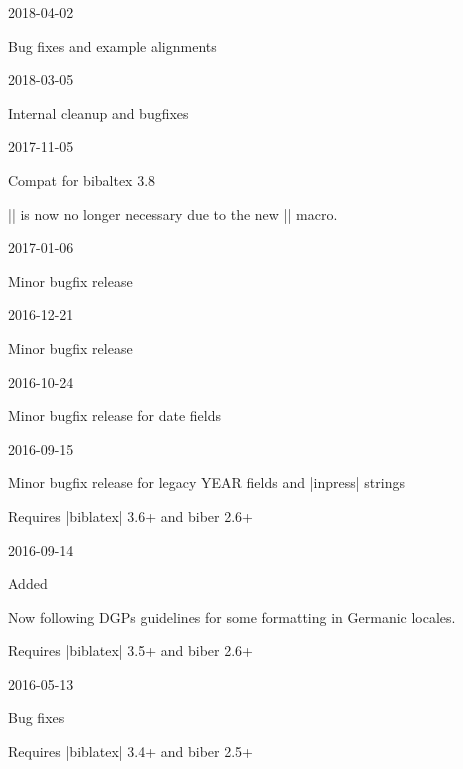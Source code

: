 \documentclass{ltxdockit}
\begin{document}
\begin{changelog}

\begin{release}{7.7}{2018-04-02}
\item Bug fixes and example alignments
\end{release}

\begin{release}{7.6}{2018-03-05}
\item Internal cleanup and bugfixes
\end{release}

\begin{release}{7.5}{2017-11-05}
\item Compat for bibaltex 3.8
\item |\DeclareLanguageMapping| is now no longer necessary due to the new
  |\DeclareLanguageMappingSuffix| macro.
\end{release}

\begin{release}{7.4}{2017-01-06}
\item Minor bugfix release
\end{release}

\begin{release}{7.3}{2016-12-21}
\item Minor bugfix release
\end{release}

\begin{release}{7.2}{2016-10-24}
\item Minor bugfix release for date fields
\end{release}

\begin{release}{7.1}{2016-09-15}
\item Minor bugfix release for legacy YEAR fields and |inpress| strings
\item Requires |biblatex| 3.6+ and biber 2.6+
\end{release}

\begin{release}{7.0}{2016-09-14}
\item Added 
\item Now following DGPs guidelines for some formatting in Germanic
  locales.
\item Requires |biblatex| 3.5+ and biber 2.6+
\end{release}

\begin{release}{6.9}{2016-05-13}
\item Bug fixes
\item Requires |biblatex| 3.4+ and biber 2.5+
\end{release}


\end{changelog}
\end{document}
